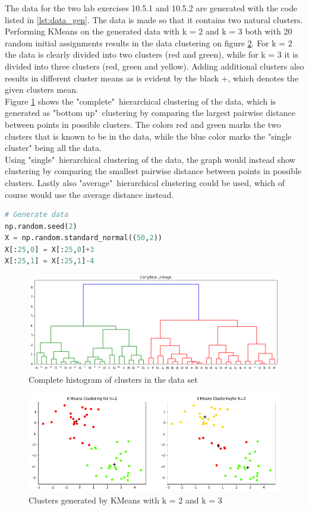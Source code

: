 The data for the two lab exercises 10.5.1 and 10.5.2 are generated with the code listed in \ref{lst:data_gen}. The data is made so that it contains two natural clusters.\\ 
Performing KMeans on the generated data with k = 2 and k = 3 both with 20 random initial assignments results in the data clustering on figure \ref{fig:KMeans}. For k = 2 the data is clearly divided into two clusters (red and green), while for k = 3 it is divided into three clusters (red, green and yellow). Adding additional clusters also results in different cluster means as is evident by the black +, which denotes the given clusters mean.\\
Figure \ref{fig:HC_Complete} shows the "complete"\ hierarchical clustering of the data, which is generated as "bottom up"\ clustering by comparing the largest pairwise distance between points in possible clusters. The colors red and green marks the two clusters that is known to be in the data, while the blue color marks the "single cluster" being all the data.\\ 
Using "single"\ hierarchical clustering of the data, the graph would instead show clustering by comparing the smallest pairwise distance between points in possible clusters. Lastly also "average"\ hierarchical clustering could be used, which of course would use the average distance instead.


\begin{lstlisting}[language=Python, caption=Code for generating the data]
# Generate data
np.random.seed(2)
X = np.random.standard_normal((50,2))
X[:25,0] = X[:25,0]+3
X[:25,1] = X[:25,1]-4
\end{lstlisting}\label{lst:data_gen}


\begin{figure}[H]
	\centering
	\includegraphics[width=14cm]{Img/HC_Complete.PNG}
	\caption{Complete histogram of clusters in the data set}
	\label{fig:HC_Complete}
\end{figure}

\begin{figure}[H]
	\centering
	\includegraphics[width=14cm]{Img/KMeans.PNG}
	\caption{Clusters generated by KMeans with k = 2 and k = 3}
	\label{fig:KMeans}
\end{figure} 


